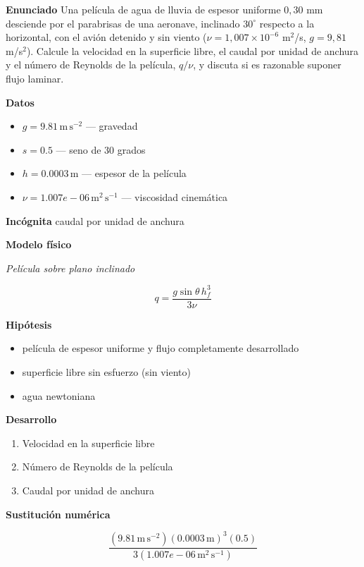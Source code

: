 \documentclass[10pt,openany]{book}
\begin{document}
\begin{tcolorbox}[title={Problema resuelto}, studiumworked, breakable]

\noindent\textbf{Enunciado}
Una película de agua de lluvia de espesor uniforme \(0{,}30\) mm desciende por el parabrisas de una aeronave, inclinado \(30^\circ\) respecto a la horizontal, con el avión detenido y sin viento (\(\nu = 1{,}007\times 10^{-6}\) m\(^2\)/s, \(g = 9{,}81\) m/s\(^2\)). Calcule la velocidad en la superficie libre, el caudal por unidad de anchura y el número de Reynolds de la película, \(q/\nu\), y discuta si es razonable suponer flujo laminar.

\noindent\textbf{Datos}
\begin{itemize}
\item $g = 9.81\,\mathrm{m}\,\mathrm{s}^{-2}$ — gravedad
\item $s = 0.5$ — seno de 30 grados
\item $h = 0.0003\,\mathrm{m}$ — espesor de la película
\item $\nu = 1.007e-06\,\mathrm{m}^{2}\,\mathrm{s}^{-1}$ — viscosidad cinemática
\end{itemize}

\noindent\textbf{Incógnita}
caudal por unidad de anchura

\noindent\textbf{Modelo físico}

\noindent\textit{Película sobre plano inclinado}

\[
q = \frac{g\sin\theta\,h_f^{3}}{3\nu}
\]

\noindent\textbf{Hipótesis}
\begin{itemize}
\item película de espesor uniforme y flujo completamente desarrollado
\item superficie libre sin esfuerzo (sin viento)
\item agua newtoniana
\end{itemize}

\noindent\textbf{Desarrollo}
\begin{enumerate}
\item
Velocidad en la superficie libre
\item
Número de Reynolds de la película
\item
Caudal por unidad de anchura
\end{enumerate}

\noindent\textbf{Sustitución numérica}

\[
\frac{\left(9.81\,\mathrm{m}\,\mathrm{s}^{-2}\right) \left(0.0003\,\mathrm{m}\right)^{3} \left(0.5\right)}{3 \left(1.007e-06\,\mathrm{m}^{2}\,\mathrm{s}^{-1}\right)}
\]


\end{tcolorbox}
\end{document}
